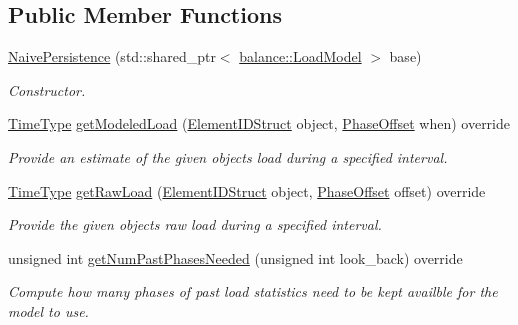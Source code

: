 \subsection*{Public Member Functions}
\begin{DoxyCompactItemize}
\item 
\hyperlink{structvt_1_1vrt_1_1collection_1_1balance_1_1_naive_persistence_a7eb9921b30fbf64f3c2dbbe5a8cce396}{Naive\+Persistence} (std\+::shared\+\_\+ptr$<$ \hyperlink{structvt_1_1vrt_1_1collection_1_1balance_1_1_load_model}{balance\+::\+Load\+Model} $>$ base)
\begin{DoxyCompactList}\small\item\em Constructor. \end{DoxyCompactList}\item 
\hyperlink{namespacevt_a876a9d0cd5a952859c72de8a46881442}{Time\+Type} \hyperlink{structvt_1_1vrt_1_1collection_1_1balance_1_1_naive_persistence_aaeae76d3e13141046f63e544ceda55c7}{get\+Modeled\+Load} (\hyperlink{namespacevt_1_1vrt_1_1collection_1_1balance_a9f5b53fafb270212279a4757d2c4cd28}{Element\+I\+D\+Struct} object, \hyperlink{structvt_1_1vrt_1_1collection_1_1balance_1_1_phase_offset}{Phase\+Offset} when) override
\begin{DoxyCompactList}\small\item\em Provide an estimate of the given object\textquotesingle{}s load during a specified interval. \end{DoxyCompactList}\item 
\hyperlink{namespacevt_a876a9d0cd5a952859c72de8a46881442}{Time\+Type} \hyperlink{structvt_1_1vrt_1_1collection_1_1balance_1_1_naive_persistence_a6bf2e0584a70493e1bfa0251d7e9b755}{get\+Raw\+Load} (\hyperlink{namespacevt_1_1vrt_1_1collection_1_1balance_a9f5b53fafb270212279a4757d2c4cd28}{Element\+I\+D\+Struct} object, \hyperlink{structvt_1_1vrt_1_1collection_1_1balance_1_1_phase_offset}{Phase\+Offset} offset) override
\begin{DoxyCompactList}\small\item\em Provide the given object\textquotesingle{}s raw load during a specified interval. \end{DoxyCompactList}\item 
unsigned int \hyperlink{structvt_1_1vrt_1_1collection_1_1balance_1_1_naive_persistence_a7c4dcce4137f9c112a114686b6cbe691}{get\+Num\+Past\+Phases\+Needed} (unsigned int look\+\_\+back) override
\begin{DoxyCompactList}\small\item\em Compute how many phases of past load statistics need to be kept availble for the model to use. \end{DoxyCompactList}\end{DoxyCompactItemize}


